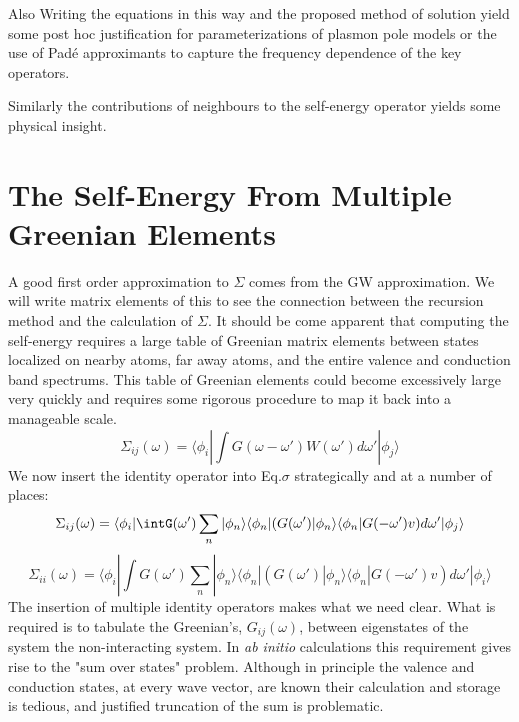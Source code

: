 \documentclass{article}
\def\ket{\rangle}
\def\bra{\langle}
\begin{document}
Also Writing the equations in this way and the proposed method of solution
yield some post hoc justification for parameterizations of plasmon
pole models or the use of Pad\'e approximants to capture the frequency dependence
of the key operators.

Similarly the contributions of neighbours to the self-energy 
operator yields some physical insight.

\section{The Self-Energy From Multiple Greenian Elements}
  A good first order approximation to $\Sigma$ comes from the GW approximation.
We will write matrix elements of this to see the connection between the
recursion method and the calculation of $\Sigma$. It should be come apparent that computing
the self-energy requires a large table of Greenian matrix elements between states localized
on nearby atoms, far away atoms, and the entire valence and conduction band spectrums. 
This table of Greenian elements could become excessively large very quickly and requires some
rigorous procedure to map it back into a manageable scale.
%
\begin{equation}
\label{eq:sigma}
\Sigma_{ij}(\omega) = \bra\phi_{i}|\int G(\omega-\omega')W(\omega')d\omega'|\phi_{j}\ket
\end{equation}
%
	We now insert the identity operator into Eq.$\sigma$ strategically and at 
a number of places:
%
\begin{equation}
\label{eq:sigma}
\Sigma_{ij}(\omega) = \bra\phi_{i}|\intG(\omega')\sum_{n}|\phi_{n}\ket\bra\phi_{n}|(G(\omega')|\phi_{n}\ket\bra\phi_{n}|G(-\omega')v)d\omega'|\phi_{j}\ket
\end{equation}
%
\begin{equation}
\label{eq:sigma_onsite}%
\Sigma_{ii}(\omega) = \bra\phi_{i}|\int G(\omega')\sum_{n}|\phi_{n}\ket\bra\phi_{n}|(G(\omega')|\phi_{n}\ket\bra\phi_{n}|G(-\omega')v)d\omega'|\phi_{i}\ket
\end{equation}
%
The insertion of multiple identity operators makes what we need clear. What is required 
is to tabulate the Greenian's, $G_{ij}(\omega)$, between eigenstates of the system
the non-interacting system. In {\it ab initio} calculations this requirement 
gives rise to the "sum over states" problem. Although in principle the valence
and conduction states, at every wave vector, are known their calculation and storage
is tedious, and justified truncation of the sum is problematic.
\end{document}
